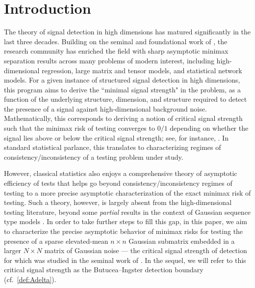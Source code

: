 \documentclass[11pt,reqno,letterpaper]{amsart}
\numberwithin{equation}{section}
\theoremstyle{plain}
\begin{document}
\maketitle


\section{Introduction} The theory of signal detection in high dimensions has matured significantly in the last three decades. Building on the seminal and foundational work of \cite{ingster2012nonparametric}, the research community has enriched the field with sharp asymptotic minimax separation results across many problems of modern interest, including high-dimensional regression, large matrix and tensor models, and statistical network models. For a given instance of structured signal detection in high dimensions, this program aims to derive the ``minimal signal strength" in the problem, as a function of the underlying structure, dimension, and structure required to detect the presence of a signal against high-dimensional background noise. Mathematically, this corresponds to deriving a notion of critical signal strength such that the minimax risk of testing converges to $0/1$ depending on whether the signal lies above or below the critical signal strength; see, for instance, \cite{donoho2004higher,addarioberry2010combinatorial,ariascastro2011global,ariascastro2011anomalous,butuceasubmatrix2013}. In standard 
statistical parlance, this translates to characterizing regimes of consistency/inconsistency of a testing problem under study. 

However, classical statistics also enjoys a comprehensive theory of asymptotic efficiency of tests that helps go beyond 
consistency/inconsistency regimes of testing to a more precise asymptotic characterization of the exact minimax risk of testing. Such a 
theory, however, is largely absent from the high-dimensional testing literature, beyond some {\em partial} results in the context of 
Gaussian sequence type models \citep{ligo2016detecting,mukherjee2020minimax}. In order to take further steps to fill this gap, in this paper, we aim to characterize the precise asymptotic behavior of minimax risks for testing the presence of a sparse elevated-mean $n \times n$ Gaussian submatrix embedded in a larger $N \times N$ matrix of Gaussian noise --- the critical signal strength of detection for which was studied in the seminal work of \cite{butuceasubmatrix2013}. In the sequel, we will refer to this critical signal strength as 
the Butucea--Ingster detection boundary (cf.~\eqref{def:Adelta}).
\end{document}
